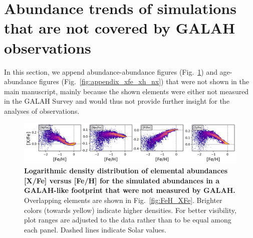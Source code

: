 \documentclass[fleqn,usenatbib]{mnras}
\begin{document}




\appendix

\section{Abundance trends of simulations that are not covered by GALAH observations} \label{sec:appendix_other_abundances}

In this section, we append abundance-abundance figures (Fig.~\ref{fig:appendix_feh_xfe_nneps}) and age-abundance figures (Fig.~\ref{fig:appendix_xfe_xh_nx}) that were not shown in the main manuscript, mainly because the shown elements were either not measured in the GALAH Survey and would thus not provide further insight for the analyses of observations.


\begin{figure}
	\includegraphics[width=\textwidth]{figures/Overview_FeH_XFe_Sim_only.png}
    \caption{
    \textbf{Logarithmic density distribution of elemental abundances [X/Fe] versus [Fe/H] for the simulated abundances in a GALAH-like footprint that were not measured by GALAH.
    }
    Overlapping elements are shown in Fig.~\ref{fig:FeH_XFe}. Brighter colors (towards yellow) indicate higher densities. For better visibility, plot ranges are adjusted to the data rather than to be equal among each panel. Dashed lines indicate Solar values.
    }
    \label{fig:appendix_feh_xfe_nneps}
\end{figure}
\end{document}
